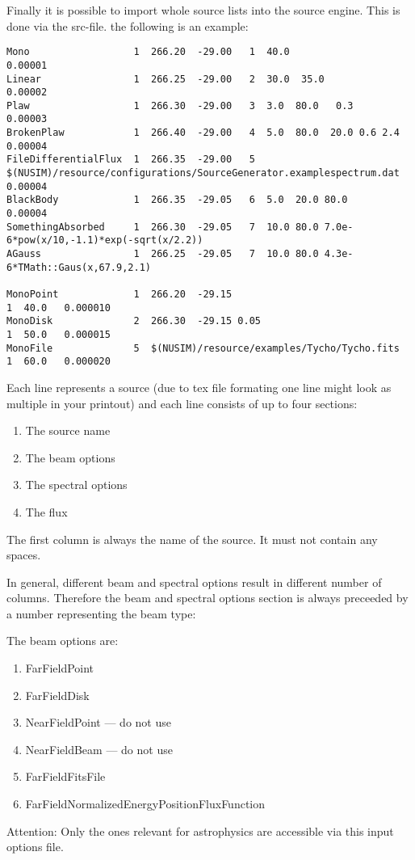 Finally it is possible to import whole source lists into the source engine.
This is done via the src-file. the following is an example:
\begin{verbatim}
Mono                  1  266.20  -29.00   1  40.0                     0.00001
Linear                1  266.25  -29.00   2  30.0  35.0               0.00002
Plaw                  1  266.30  -29.00   3  3.0  80.0   0.3          0.00003
BrokenPlaw            1  266.40  -29.00   4  5.0  80.0  20.0 0.6 2.4  0.00004
FileDifferentialFlux  1  266.35  -29.00   5  $(NUSIM)/resource/configurations/SourceGenerator.examplespectrum.dat 0.00004
BlackBody             1  266.35  -29.05   6  5.0  20.0 80.0           0.00004
SomethingAbsorbed     1  266.30  -29.05   7  10.0 80.0 7.0e-6*pow(x/10,-1.1)*exp(-sqrt(x/2.2))
AGauss                1  266.25  -29.05   7  10.0 80.0 4.3e-6*TMath::Gaus(x,67.9,2.1)

MonoPoint             1  266.20  -29.15                               1  40.0   0.000010
MonoDisk              2  266.30  -29.15 0.05                          1  50.0   0.000015
MonoFile              5  $(NUSIM)/resource/examples/Tycho/Tycho.fits  1  60.0   0.000020
\end{verbatim}

Each line represents a source (due to tex file formating one line might look as multiple in your printout) and each line consists of up to four sections:
\begin{enumerate}
\item The source name
\item The beam options
\item The spectral options
\item The flux
\end{enumerate}

The first column is always the name of the source. It must not contain any spaces.

In general, different beam and spectral options result in different number of columns.
Therefore the beam and spectral options section is always preceeded by a number representing the beam type:

The beam options are:
\begin{enumerate}
\item FarFieldPoint
\item FarFieldDisk
\item NearFieldPoint --- do not use
\item NearFieldBeam --- do not use
\item FarFieldFitsFile
\item FarFieldNormalizedEnergyPositionFluxFunction
\end{enumerate}
Attention: Only the ones relevant for astrophysics are accessible via this input options file.

